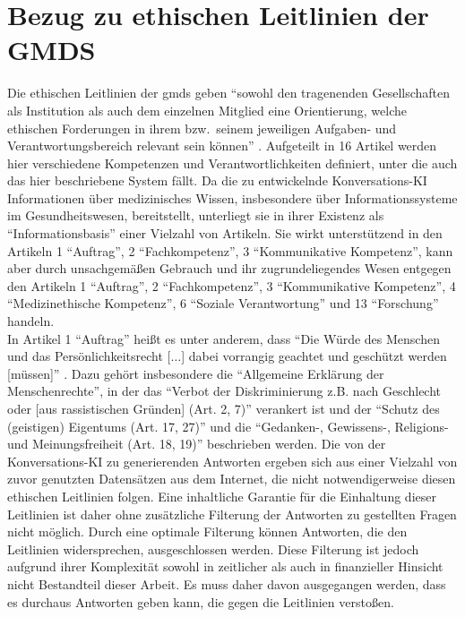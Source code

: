\section{Bezug zu ethischen Leitlinien der GMDS}\label{sec:gmds_ethik}

Die ethischen Leitlinien der \ac{gmds} \citep{gmds_eth} geben \enquote{sowohl den tragenenden Gesellschaften als Institution als auch dem einzelnen Mitglied eine Orientierung,
welche ethischen Forderungen in ihrem bzw.\ seinem jeweiligen Aufgaben- und Verantwortungsbereich relevant sein können} \citep{gmds_eth}.
Aufgeteilt in 16 Artikel werden hier verschiedene Kompetenzen und Verantwortlichkeiten definiert, unter die auch das hier beschriebene System fällt.
Da die zu entwickelnde Konversations-KI Informationen über medizinisches Wissen, insbesondere über Informationssysteme im Gesundheitswesen, bereitstellt,
unterliegt sie in ihrer Existenz als \enquote{Informationsbasis} einer Vielzahl von Artikeln.
Sie wirkt unterstützend in den Artikeln 1 \enquote{Auftrag}, 2 \enquote{Fachkompetenz}, 3 \enquote{Kommunikative Kompetenz},
kann aber durch unsachgemäßen Gebrauch und ihr zugrundeliegendes Wesen entgegen den Artikeln 1 \enquote{Auftrag}, 2 \enquote{Fachkompetenz}, 3 \enquote{Kommunikative Kompetenz},
4 \enquote{Medizinethische Kompetenz}, 6 \enquote{Soziale Verantwortung} und 13 \enquote{Forschung} handeln.\\

In Artikel 1 \enquote{Auftrag} heißt es unter anderem, dass
\enquote{Die Würde des Menschen und das Persönlichkeitsrecht [$\dots$] dabei vorrangig geachtet und geschützt werden [müssen]} \citep{gmds_eth}.
Dazu gehört insbesondere die \enquote{Allgemeine Erklärung der Menschenrechte},
in der das \enquote{Verbot der Diskriminierung z.B. nach Geschlecht oder [aus rassistischen Gründen] (Art. 2, 7)}
verankert ist und
der \enquote{Schutz des (geistigen) Eigentums (Art. 17, 27)} und die \enquote{Gedanken-, Gewissens-, Religions- und Meinungsfreiheit (Art. 18, 19)} beschrieben werden.
Die von der Konversations-KI zu generierenden Antworten ergeben sich aus einer Vielzahl von zuvor genutzten Datensätzen aus dem Internet, die nicht notwendigerweise diesen ethischen Leitlinien folgen.
Eine inhaltliche Garantie für die Einhaltung dieser Leitlinien ist daher ohne zusätzliche Filterung der Antworten zu gestellten Fragen nicht möglich.
Durch eine optimale Filterung können Antworten, die den Leitlinien widersprechen, ausgeschlossen werden.
Diese Filterung ist jedoch aufgrund ihrer Komplexität sowohl in zeitlicher als auch in finanzieller Hinsicht nicht Bestandteil dieser Arbeit.
Es muss daher davon ausgegangen werden, dass es durchaus Antworten geben kann, die gegen die Leitlinien verstoßen.\\


